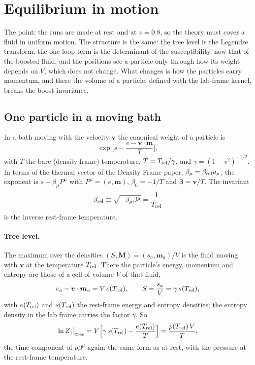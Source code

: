 \documentclass[11pt,aps,preprint,nofootinbib,superscriptaddress,tightenlines]{revtex4-2}
\def\st{\begin{equation}}
\def\stp{\end{equation}}
\let\oldparagraph\paragraph
\renewcommand{\paragraph}{\par\bigskip\oldparagraph}
\begin{document}
\section{Equilibrium in motion}
\label{sec:motion}

The point: the runs are made at rest and at $v=0.8$, so the theory must cover a fluid in uniform motion.  The structure is the same: the tree level is the
Legendre transform, the one-loop term is the determinant of the susceptibility, now that of the boosted fluid, and the positions see a particle only through how
its weight depends on $V$, which does not change.  What changes is how the particles carry momentum, and there the volume of a particle, defined with the
lab-frame kernel, breaks the boost invariance.

\subsection{One particle in a moving bath}
\label{sec:motion_one}

In a bath moving with the velocity $\bm v$ the canonical weight of a particle is
\st
\exp\Big[s-\frac{e-\bm v\cdot\bm m}{T}\Big] ,
\stp
with $T$ the bare (density-frame) temperature, $T=T_{\rm rel}/\gamma$, and $\gamma=(1-v^2)^{-1/2}$.  In terms of the thermal vector of the Density Frame paper,
$\beta_\mu=\beta_{\rm rel}u_\mu$, the exponent is $s+\beta_\mu P^\mu$ with $P^\mu=(e,\bm m)$, $\beta_0=-1/T$ and $\bm\beta=\bm v/T$.  The invariant
\st
\beta_{\rm rel}\equiv\sqrt{-\beta_\mu\beta^\mu}=\frac1{T_{\rm rel}}
\stp
is the inverse rest-frame temperature.

\paragraph{Tree level.}  The maximum over the densities $(S,\bm M)=(s_a,\bm m_a)/V$ is the fluid moving with $\bm v$ at the temperature $T_{\rm rel}$.  There the particle's
energy, momentum and entropy are those of a cell of volume $V$ of that fluid,
\st
e_a-\bm v\cdot\bm m_a=V\,e(T_{\rm rel}),\qquad S=\frac{s_a}{V}=\gamma\,s(T_{\rm rel}) ,
\stp
with $e(T_{\rm rel})$ and $s(T_{\rm rel})$ the rest-frame energy and entropy densities; the entropy density in the lab frame carries the factor $\gamma$.  So
\st
\ln Z_1\big|_{\rm tree}=V\Big[\gamma\,s(T_{\rm rel})-\frac{e(T_{\rm rel})}{T}\Big]=\frac{p(T_{\rm rel})\,V}{T} ,
\stp
the time component of $p\beta^\mu$ again: the same form as at rest, with the pressure at the rest-frame temperature.
\end{document}

